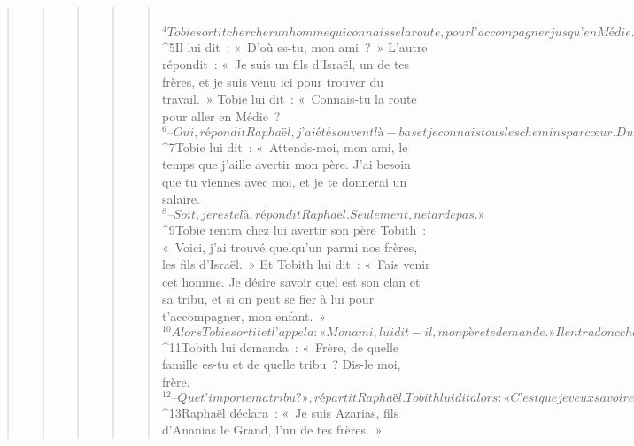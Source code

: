 \begin{verse}
\begin{verse}
\begin{verse}
\begin{verse}
\begin{verse}
         
${}^{4}Tobie sortit chercher un homme qui connaisse la route, pour l’accompagner jusqu’en Médie. À peine sorti, il trouva l’ange Raphaël debout devant lui, mais il ne savait pas que c’était un ange de Dieu. 
${}^{5}Il lui dit : « D’où es-tu, mon ami ? » L’autre répondit : « Je suis un fils d’Israël, un de tes frères, et je suis venu ici pour trouver du travail. » Tobie lui dit : « Connais-tu la route pour aller en Médie ? 
${}^{6}– Oui, répondit Raphaël, j’ai été souvent là-bas et je connais tous les chemins par cœur. Durant mes nombreux séjours, je passais la nuit chez Gabaël, notre frère, qui habite à Raguès de Médie. Il faut deux bonnes journées de marche pour aller d’Ecbatane à Raguès, car Raguès se trouve dans la montagne, et Ecbatane, au milieu de la plaine. » 
${}^{7}Tobie lui dit : « Attends-moi, mon ami, le temps que j’aille avertir mon père. J’ai besoin que tu viennes avec moi, et je te donnerai un salaire. 
${}^{8}– Soit, je reste là, répondit Raphaël. Seulement, ne tarde pas. »
${}^{9}Tobie rentra chez lui avertir son père Tobith : « Voici, j’ai trouvé quelqu’un parmi nos frères, les fils d’Israël. » Et Tobith lui dit : « Fais venir cet homme. Je désire savoir quel est son clan et sa tribu, et si on peut se fier à lui pour t’accompagner, mon enfant. » 
${}^{10}Alors Tobie sortit et l’appela : « Mon ami, lui dit-il, mon père te demande. » Il entra donc chez Tobith, qui le salua le premier, et il lui répondit : « Grande joie pour toi ! » Tobith lui répliqua : « Quelle joie pourrais-je encore avoir ? Moi, qui suis privé de l’usage de mes yeux, je ne vois même plus la lumière du ciel, mais je suis plongé dans les ténèbres, comme les morts qui ne contemplent plus la lumière. Bien que vivant, me voici parmi les morts ; j’entends la voix des gens, mais eux, je ne les aperçois pas. » Raphaël lui dit : « Courage ! Dieu ne tardera pas à te guérir. Courage ! » Tobith lui dit alors : « Mon fils Tobie veut aller en Médie. Pourrais-tu l’accompagner et lui servir de guide ? Je te donnerai un salaire, mon frère. – Oui, répondit Raphaël, je suis en mesure de l’accompagner : je connais toutes les routes, car je suis allé souvent en Médie, j’en ai traversé toutes les plaines et toutes les montagnes ; toutes les routes me sont familières. » 
${}^{11}Tobith lui demanda : « Frère, de quelle famille es-tu et de quelle tribu ? Dis-le moi, frère. 
${}^{12}– Que t’importe ma tribu ? », répartit Raphaël. Tobith lui dit alors : « C’est que je veux savoir en vérité de qui tu es le fils, et quel est ton nom, frère. » 
${}^{13}Raphaël déclara : « Je suis Azarias, fils d’Ananias le Grand, l’un de tes frères. » 

\end{verse}
\end{verse}
\end{verse}
\end{verse}
\end{verse}
